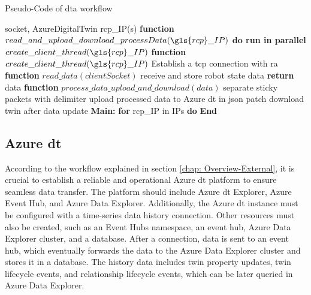 \begin{breakablealgorithm}
    \caption{Pseudo-Code of \gls{dta} workflow}
    \label{alg:DTAgentPseudoCode}
    \begin{algorithmic}
     socket, AzureDigitalTwin
     \gls{rcp}\_IP(s)
    \State \textbf{function} {$read\_and\_upload\_download\_processData(\gls{rcp}\_IP)$}
        \State \qquad \textbf{do run in parallel}
            \State \qquad \qquad $create\_client\_thread(\gls{rcp}\_IP)$       
    \State \textbf{function} {$create\_client\_thread(\gls{rcp}\_IP)$}
        \State \qquad Establish a \gls{tcp} connection with \gls{ra}
        \State {}  
        \State {}    
    \State \textbf{function} {$read\_data(clientSocket)$}
        \State \qquad receive and store robot state data
        \State \qquad \textbf{return} data
    \State \textbf{function} {$process\_data\_upload\_and\_download(data)$}
        \State \qquad separate sticky packets with delimiter
        \State \qquad upload processed data to Azure \gls{dt} in json patch
        \State \qquad download twin after data update 
    \State \textbf{Main:}
        \State \qquad \textbf{for} \gls{rcp}\_IP in IPs \textbf{do}
        \State \qquad {}
        \State \textbf{End}
    \end{algorithmic}
\end{breakablealgorithm}



\subsection{Azure \gls{dt}}
According to the workflow explained in section \ref{chap: Overview-External}, 
it is crucial to establish a reliable and operational Azure \gls{dt} platform 
to ensure seamless data transfer. The platform should include Azure \gls{dt} Explorer, 
Azure Event Hub, and Azure Data Explorer. Additionally, the Azure \gls{dt} 
instance must be configured with a time-series data history connection. Other resources 
must also be created, such as an Event Hubs namespace, an event hub, Azure Data Explorer 
cluster, and a database. 
After a connection, data is sent to an event hub, which eventually forwards the data to 
the Azure Data Explorer cluster and stores it in a database. The history data includes 
twin property updates, twin lifecycle events, and relationship lifecycle events, which 
can be later queried in Azure Data Explorer.


